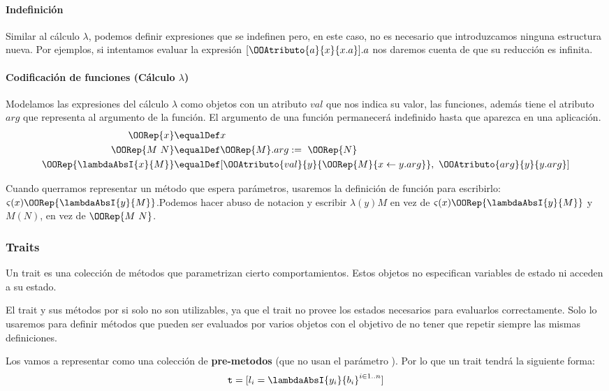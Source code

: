 \paragraph{Indefinición} Similar al cálculo $\lambda$, podemos definir expresiones que se indefinen pero, en este caso, no es necesario que introduzcamos ninguna estructura nueva. Por ejemplos, si intentamos evaluar la expresión $[\OOAtributo{a}{x}{x.a}].a$ nos daremos cuenta de que su reducción es infinita.

\paragraph{Codificación de funciones (Cálculo $\lambda$)}
Modelamos las expresiones del cálculo $\lambda$ como objetos con un atributo $val$ que nos indica su valor, las funciones, además tiene el atributo $arg$ que representa al argumento de la función. El argumento de una función permanecerá indefinido hasta que aparezca en una aplicación.
\begin{align*}
\OORep{x} &\equalDef x\\
\OORep{M~N} &\equalDef \OORep{M}.arg :=~\OORep{N}\\
\OORep{\lambdaAbsI{x}{M}} &\equalDef 
[\OOAtributo{val}{y}{\OORep{M}\{x\leftarrow y.arg\}},~\OOAtributo{arg}{y}{y.arg}]\\
\end{align*}

Cuando querramos representar un método que espera parámetros, usaremos la definición de función para escribirlo: $\varsigma(x)\OORep {\lambdaAbsI{y}{M}}$.Podemos hacer abuso de notacion y escribir $\lambda(y)M$ en vez de $\varsigma(x)\OORep {\lambdaAbsI{y}{M}}$ y $M(N)$, en vez de $\OORep{M~N}$.

\subsubsection{Traits}
Un trait es una colección de métodos que parametrizan cierto comportamientos. Estos objetos no especifican variables de estado ni acceden a su estado.

El trait y sus métodos por si solo no son utilizables, ya que el trait no provee los estados necesarios para evaluarlos correctamente. Solo lo usaremos para definir métodos que pueden ser evaluados por varios objetos con el objetivo de no tener que repetir siempre las mismas definiciones.

Los vamos a representar como una colección de \textbf{pre-metodos} (que no usan el parámetro ). Por lo que un trait tendrá la siguiente forma:
$$\texttt{t} = [l_i = \lambdaAbsI{y_i}{b_i}^{i\in 1..n}]$$

